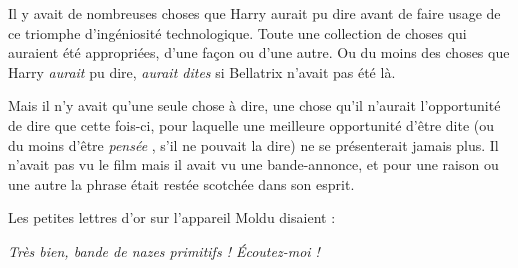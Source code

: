 Il y avait de nombreuses choses que Harry aurait pu dire avant de faire usage de ce triomphe d'ingéniosité technologique. Toute une collection de choses qui auraient été appropriées, d'une façon ou d'une autre. Ou du moins des choses que Harry \emph{aurait}  pu dire, \emph{aurait dites}  si Bellatrix n'avait pas été là.

Mais il n'y avait qu'une seule chose à dire, une chose qu'il n'aurait l'opportunité de dire que cette fois-ci, pour laquelle une meilleure opportunité d'être dite (ou du moins d'être \emph{pensée} , s'il ne pouvait la dire) ne se présenterait jamais plus. Il n'avait pas vu le film mais il avait vu une bande-annonce, et pour une raison ou une autre la phrase était restée scotchée dans son esprit.

Les petites lettres d'or sur l'appareil Moldu disaient :

\emph{Très bien, bande de nazes primitifs ! Écoutez-moi !} 

